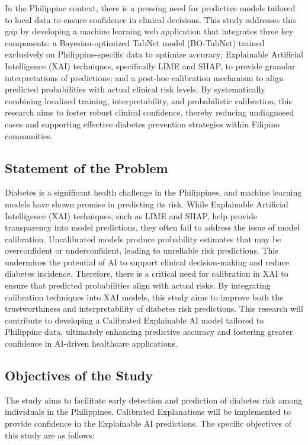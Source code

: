 \documentclass[11pt,a4paper,titlepage]{article}
\begin{document}
In the Philippine context, there is a pressing need for predictive models tailored to local data to ensure confidence in clinical decisions. This study addresses this gap by developing a machine learning web application that integrates three key components: a Bayesian-optimized TabNet model (BO-TabNet) trained exclusively on Philippine-specific data to optimize accuracy; Explainable Artificial Intelligence (XAI) techniques, specifically LIME and SHAP, to provide granular interpretations of predictions; and a post-hoc calibration mechanism to align predicted probabilities with actual clinical risk levels. By systematically combining localized training, interpretability, and probabilistic calibration, this research aims to foster robust clinical confidence, thereby reducing undiagnosed cases and supporting effective diabetes prevention strategies within Filipino communities.


\subsection{Statement of the Problem}
Diabetes is a significant health challenge in the Philippines, and machine learning models have shown promise in predicting its risk. While Explainable Artificial Intelligence (XAI) techniques, such as LIME and SHAP, help provide transparency into model predictions, they often fail to address the issue of model calibration. Uncalibrated models produce probability estimates that may be overconfident or underconfident, leading to unreliable risk predictions. This undermines the potential of AI to support clinical decision-making and reduce diabetes incidence. Therefore, there is a critical need for calibration in XAI to ensure that predicted probabilities align with actual risks. By integrating calibration techniques into XAI models, this study aims to improve both the trustworthiness and interpretability of diabetes risk predictions. This research will contribute to developing a Calibrated Explainable AI model tailored to Philippine data, ultimately enhancing predictive accuracy and fostering greater confidence in AI-driven healthcare applications.

\subsection{Objectives of the Study}

 The study aims to facilitate early detection and prediction of diabetes risk among individuals in the Philippines. Calibrated Explanations will be implemented to provide confidence in the Explainable AI predictions. The specific objectives of this study are as follows:
\end{document}
